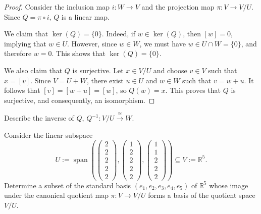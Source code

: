 \begin{proof}
  Consider the inclusion map $i \colon W \to V$ and the projection map $\pi \colon V \to V/U$. Since $Q = \pi \circ i$, $Q$ is a linear map.

  We claim that $\ker(Q) = \{0\}$. Indeed, if $w \in \ker(Q)$, then $[w] = 0$, implying that $w \in U$. However, since $w \in W$, we must have $w \in U \cap W = \{0\}$, and therefore $w = 0$. This shows that $\ker(Q) = \{0\}$.

  We also claim that $Q$ is surjective. Let $x \in V/U$ and choose $v \in V$ such that $x = [v]$. Since $V = U + W$, there exist $u \in U$ and $w \in W$ such that $v = w + u$. It follows that $[v] = [w + u] = [w]$, so $Q(w) = x$. This proves that $Q$ is surjective, and consequently, an isomorphism.
\end{proof}

\begin{exercise}
  \label{exc:inverse_from_complement}
  Describe the inverse of $Q$, $Q^{-1} \colon V/U \xrightarrow{\cong} W$.
\end{exercise}

\begin{exercise}
\label{exc:basis_of_quotient_space_r5}
Consider the linear subspace
\[
U := \operatorname{span}\left( \begin{pmatrix} 2 \\ 2 \\ 2 \\ 2 \\ 2 \end{pmatrix}, \begin{pmatrix} 1 \\ 2 \\ 2 \\ 2 \\ 2 \end{pmatrix}, \begin{pmatrix} 1 \\ 1 \\ 2 \\ 2 \\ 2 \end{pmatrix} \right) \subseteq V := \mathbb{R}^5.
\]
Determine a subset of the standard basis $(e_1, e_2, e_3, e_4, e_5)$ of $\mathbb{R}^5$ whose image under the canonical quotient map $\pi \colon V \to V/U$ forms a basis of the quotient space $V/U$.
\end{exercise}

